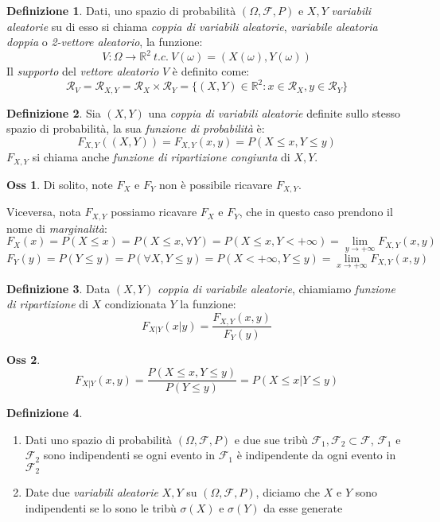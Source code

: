 \documentclass[12pt, a4paper]{report}
\theoremstyle{definition}
\newtheorem{definition}{Definizione}[section]
\newtheorem*{observation}{Oss}
\DeclareRobustCommand{\F}{\mathcal{F}}%
\DeclareRobustCommand{\R}{\mathbb{R}}%
\DeclareRobustCommand{\supp}{\mathcal{R}}%
\DeclareRobustCommand{\probspace}{(\Omega,\F,P)}
\begin{document}
\begin{definition}
	Dati, uno spazio di probabilità $\probspace$ e $X,Y$ \emph{variabili aleatorie}
	su di esso si chiama \emph{coppia di variabili aleatorie}, \emph{variabile
	aleatoria doppia} o \emph{2-vettore aleatorio}, la funzione:
	\[V:\Omega\rightarrow\R^2\ t.c.\ V(\omega)=(X(\omega), Y(\omega))\]
	Il \emph{supporto} del \emph{vettore aleatorio} $V$ è definito come:
	\[\supp_V=\supp_{X,Y}=\supp_X\times\supp_Y=\{(X,Y)\in\R^2:x\in\supp_X,
	y\in\supp_Y\}\]
\end{definition}
\begin{definition}
	Sia $(X,Y)$ una \emph{coppia di variabili aleatorie} definite sullo
	stesso spazio di probabilità, la sua \emph{funzione di probabilità} è:
	\[F_{X,Y}((X,Y))=F_{X,Y}(x,y)=P(X\leq x, Y\leq y)\]
	$F_{X,Y}$ si chiama anche \emph{funzione di ripartizione congiunta} di $X,Y$.
\end{definition}

\begin{observation}
	Di solito, note $F_X$ e $F_Y$ non è possibile ricavare $F_{X,Y}$.
	
	Viceversa, nota $F_{X,Y}$ possiamo ricavare $F_X$ e $F_Y$, che in questo caso
	prendono il nome di \emph{marginalità}:
	\[F_X(x)=P(X\leq x)=P(X\leq x, \forall Y)=P(X\leq x, Y<+\infty)=
	\lim_{y\rightarrow +\infty}F_{X,Y}(x,y)\]
	\[F_Y(y)=P(Y\leq y)=P(\forall X, Y\leq y)=P(X<+\infty, Y\leq y)=
	\lim_{x\rightarrow +\infty}F_{X,Y}(x,y)\]
\end{observation}

\begin{definition}
	Data $(X,Y)$ \emph{coppia di variabile aleatorie}, chiamiamo \emph{funzione
	di ripartizione} di $X$ condizionata $Y$ la funzione:
	\[F_{X|Y}(x|y)=\frac{F_{X,Y}(x,y)}{F_Y(y)}\]
\end{definition}
\begin{observation}
	\[F_{X|Y}(x,y)=\frac{P(X\leq x, Y\leq y)}{P(Y\leq y)}=P(X\leq x|Y\leq y)\]
\end{observation}

\begin{definition}
	\mbox{}
	\begin{enumerate}[label=(\roman*)]
		\item Dati uno spazio di probabilità $\probspace$ e due sue tribù $\F_1,\F_2\subset\F$,
		$\F_1$ e $\F_2$ sono indipendenti se ogni evento in $\F_1$ è indipendente da
		ogni evento in $\F_2$
		\item Date due \emph{variabili aleatorie} $X,Y$ su $\probspace$, diciamo
		che $X$ e $Y$ sono indipendenti se lo sono le tribù $\sigma(X)$ e $\sigma(Y)$
		da esse generate
	\end{enumerate}
\end{definition}
\end{document}
